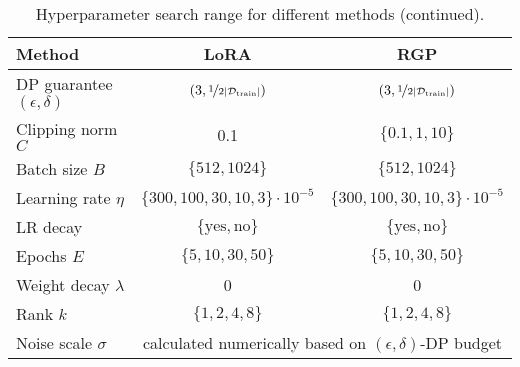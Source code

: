 \begin{table}[H]
    \centering
    \setlength{\tabcolsep}{7pt}
    \renewcommand{\arraystretch}{1.2}
    \caption{Hyperparameter search range for different methods (continued).}
    \begin{tabular}{@{} l c c @{}}
        \toprule
        Method & LoRA & RGP \\
        \midrule
        DP guarantee $(\epsilon, \delta)$ &
        $(3, \nicefrac{1}{2|\mathcal{D}_{\text{train}}|})$ & 
        $(3, \nicefrac{1}{2|\mathcal{D}_{\text{train}}|})$ \\
        Clipping norm $C$ &0.1 & $\{ 0.1, 1, 10\}$ \\
        Batch size $B$ 
        &$\{512, 1024\}$ 
        &$\{512, 1024\}$ \\
        Learning rate $\eta$ & 
        $ \{300, 100, 30, 10, 3\} \cdot 10^{-5}$ & 
        $\{300, 100, 30, 10, 3\} \cdot 10^{-5}$ \\
        LR decay
        & $\{ \text{yes}, \text{no}\}$ 
        & $\{ \text{yes}, \text{no}\}$ \\
        Epochs $E$
        &$\{5, 10, 30, 50\}$
        & $\{5, 10, 30, 50\}$\\
        Weight decay $\lambda$ & 0 & 0 \\
        Rank $k$ 
        &$\{1,2, 4,8\}$ & $\{1,2,4, 8\}$ \\
        Noise scale $\sigma$ & 
        \multicolumn{2}{c}{calculated numerically based on $(\epsilon, \delta)$-DP budget} \\
        \bottomrule
        \end{tabular}
        \label{tab:hparams_low_rank}
\end{table}
